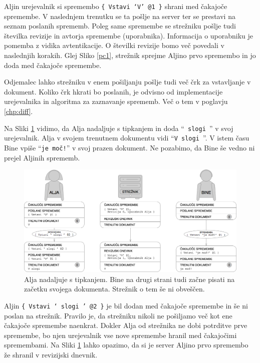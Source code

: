 \documentclass[a4paper, 12pt, twoside]{book}
\begin{document}
Aljin urejevalnik si spremembo {\tt \{ Vstavi ‘V’ @1 \}} shrani med čakajoče spremembe. V naslednjem trenutku se ta pošlje na server ter se prestavi na seznam poslanih sprememb. Poleg same spremembe se strežniku pošlje tudi številka revizije in avtorja spremembe (uporabnika). Informacija o uporabniku je pomemba z vidika avtentikacije. O številki revizije bomo več povedali v naslednjih korakih. Glej Sliko \ref{pc1}, strežnik sprejme Aljino prvo spremembo in jo doda med čakajoče spremembe.

\pagebreak

Odjemalec lahko strežniku v enem pošiljanju pošlje tudi več črk za vstavljanje v dokument. Koliko črk hkrati bo poslanih, je odvisno od implementacije urejevalnika in algoritma za zaznavanje sprememb. Več o tem v poglavju \ref{chp:diff}.

Na Sliki \ref{pc2} vidimo, da Alja nadaljuje s tipkanjem in doda “{\tt \ slogi }” v svoj urejevalnik. Alja v svojem trenutnem dokumentu vidi “{\tt V slogi }”. V istem času Bine vpiše “{\tt je moč!}” v svoj prazen dokument. Ne pozabimo, da Bine še vedno ni prejel Aljinih sprememb.

\begin{figure}[placement h]
\begin{center}
\includegraphics[width=14cm]{pc2.png}
\end{center}
\caption{Alja nadaljuje s tipkanjem. Bine na drugi strani tudi začne pisati na začetku svojega dokumenta. Strežnik o tem še ni obveščen.}
\label{pc2}
\end{figure}

Aljin {\tt \{ Vstavi ‘ slogi ’ @2 \}} je bil dodan med čakajoče spremembe in še ni poslan na strežnik. Pravilo je, da strežniku nikoli ne pošiljamo več kot ene čakajoče spremembe naenkrat. Dokler Alja od strežnika ne dobi potrditve prve spremembe, bo njen urejevalnik vse nove spremembe hranil med čakajočimi spremembami. Na Sliki \ref{pc2} lahko opazimo, da si je server Aljino prvo spremembo že shranil v revizijski dnevnik.
\end{document}
